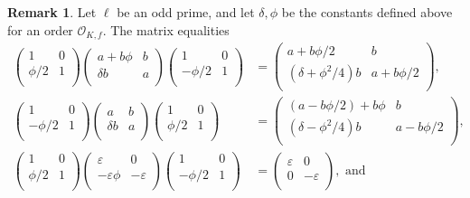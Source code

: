 \documentclass[11pt]{amsart}
\theoremstyle{definition}
\newtheorem{remark}[defn]{Remark}
\newcommand{\Of}{\mathcal{O}_{K,f}}
\begin{document}
\begin{remark}\label{rem-changebasis}
    Let $\ell$ be an odd prime, and let $\delta,\phi$ be the constants defined above for an order $\Of$. The matrix equalities 
    \begin{align*} \left(\begin{array}{cc}  1 & 0\\ \phi/2 & 1\\ \end{array}\right)\left(\begin{array}{cc}  a+b\phi & b\\ \delta b & a\\ \end{array}\right) \left(\begin{array}{cc}  1 & 0\\ -\phi/2 & 1\\ \end{array}\right) &= \left(\begin{array}{cc}  a+b\phi/2 & b\\ (\delta + \phi^2/4)b & a+b\phi/2\\ \end{array}\right), \\
    \left(\begin{array}{cc}  1 & 0\\ -\phi/2 & 1\\ \end{array}\right)\left(\begin{array}{cc}  a & b\\ \delta b & a\\ \end{array}\right)\left(\begin{array}{cc}  1 & 0\\ \phi/2 & 1\\ \end{array}\right) &= \left(\begin{array}{cc}  (a-b\phi/2)+b\phi & b\\ (\delta-\phi^2/4) b & a-b\phi/2\\ \end{array}\right),\\
    \left(\begin{array}{cc}  1 & 0\\ \phi/2 & 1\\ \end{array}\right)\left(\begin{array}{cc}  \varepsilon & 0\\ -\varepsilon\phi & -\varepsilon\\ \end{array}\right) \left(\begin{array}{cc}  1 & 0\\ -\phi/2 & 1\\ \end{array}\right) &= \left(\begin{array}{cc}  \varepsilon & 0\\ 0 & -\varepsilon\\ \end{array}\right), \text{ and}\\

\end{align*}
\end{remark}
\end{document}
